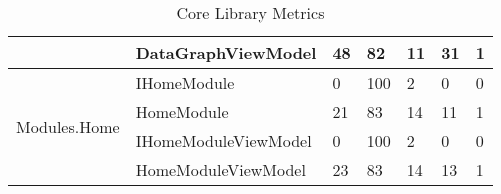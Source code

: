 {{\begin{table}[ht]
\begin{scriptsize}
\begin{center}
\begin{tabularx}{\textwidth}{| l | X | l | l | l | l | l |}
											   & DataGraphViewModel & 48 & 82 & 11 & 31 & 1\\\cline{2-7}
				\hline
				\multirow{4}{*}{Modules.Home} & IHomeModule & 0 & 100 & 2 & 0 & 0\\\cline{2-7}
									  		  & HomeModule & 21 & 83 & 14 & 11 & 1\\\cline{2-7}
									  		  & IHomeModuleViewModel & 0 & 100 & 2 & 0 & 0\\\cline{2-7}
									  		  & HomeModuleViewModel & 23 & 83 & 14 & 13 & 1\\\cline{2-7}				
				\hline
				
				\end{tabularx}
				\caption{Core Library Metrics}
				\label{tab:CoreLib}
			\end{center}
		\end{scriptsize}
		\end{table}

	}
}

	
